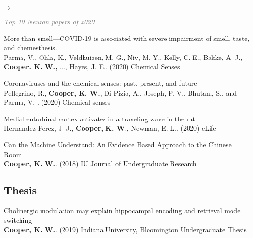 \documentclass[10pt]{cooperCV2}
\begin{document}
\begin{etaremune}[resume,itemindent=-1.5\bibhang, topsep=0pt,
				   itemsep=\bibsep,partopsep=0pt,parsep=0pt,leftmargin={\bibhang+\widthof{[999]}}]
     	\begin{list}{$\drsh$}{}
     	
	      \item \textcolor{grey}{\textit{Top 10 Neuron papers of 2020} }
     	
     	\end{list} 
     
	
    \item More than smell—COVID-19 is associated with severe impairment of smell, taste, and chemesthesis. \\
     Parma, V., Ohla, K., Veldhuizen, M. G., Niv, M. Y., Kelly, C. E., Bakke, A. J., \textbf{Cooper. K. W.,} ..., Hayes, J. E.. (2020) Chemical Senses 
     
	
    \item Coronaviruses and the chemical senses: past, present, and future \\
     Pellegrino, R., \textbf{Cooper, K. W.}, Di Pizio, A., Joseph, P. V., Bhutani, S., and Parma, V. . (2020) Chemical senses 
     
	
    \item Medial entorhinal cortex activates in a traveling wave in the rat \\
     Hernandez-Perez, J. J., \textbf{Cooper, K. W.}, Newman, E. L.. (2020) eLife 
     
	
    \item Can the Machine Understand: An Evidence Based Approach to the Chinese Room \\
     \textbf{Cooper, K. W.}. (2018) IU Journal of Undergraduate Research 
     
	

\end{etaremune}

 

	

\subsection{Thesis} 
% 
\begin{etaremune}[resume,itemindent=-1.5\bibhang, topsep=0pt,
				   itemsep=\bibsep,partopsep=0pt,parsep=0pt,leftmargin={\bibhang+\widthof{[999]}}] 
    
    \item Cholinergic modulation may explain hippocampal encoding and retrieval mode switching \\
     \textbf{Cooper, K. W.}. (2019) Indiana University, Bloomington Undergraduate Thesis 
     
	

\end{etaremune}
\end{document}

